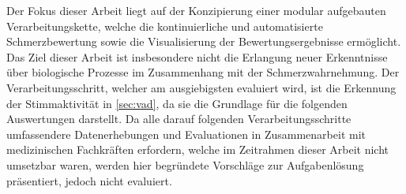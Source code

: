 Der Fokus dieser Arbeit liegt auf der Konzipierung einer modular aufgebauten Verarbeitungskette, welche die kontinuierliche und automatisierte Schmerzbewertung sowie die Visualisierung der Bewertungsergebnisse ermöglicht. Das Ziel dieser Arbeit ist insbesondere nicht die Erlangung neuer Erkenntnisse über biologische Prozesse im Zusammenhang mit der Schmerzwahrnehmung. Der Verarbeitungsschritt, welcher am ausgiebigsten evaluiert wird, ist die Erkennung der Stimmaktivität in \autoref{sec:vad}, da sie die Grundlage für die folgenden Auswertungen darstellt. Da alle darauf folgenden Verarbeitungsschritte umfassendere Datenerhebungen und Evaluationen in Zusammenarbeit mit medizinischen Fachkräften erfordern, welche im Zeitrahmen dieser Arbeit nicht umsetzbar waren, werden hier begründete Vorschläge zur Aufgabenlösung präsentiert, jedoch nicht evaluiert.